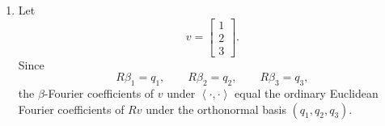\documentclass[12pt]{article}
\newcommand{\ip}[2]{\left\langle #1,#2\right\rangle}
\begin{document}
\begin{enumerate}[label=(\alph*)]
  Now pull this Euclidean orthonormal basis back to the original space. Since
  \[
    R^{-1}=
    \begin{bmatrix}
      1&0&-1\\
      0&\frac1{\sqrt2}&0\\
      0&0&1
    \end{bmatrix},
  \]
  we get
  \[
    R^{-1}q_1
    =
    \begin{bmatrix}
      1&0&-1\\
      0&\frac1{\sqrt2}&0\\
      0&0&1
    \end{bmatrix}
    \begin{bmatrix}1\\0\\0\end{bmatrix}
    =
    e_1,
  \]
  \[
    R^{-1}q_2
    =
    \begin{bmatrix}
      1&0&-1\\
      0&\frac1{\sqrt2}&0\\
      0&0&1
    \end{bmatrix}
    \begin{bmatrix}0\\1\\0\end{bmatrix}
    =
    \frac{e_2}{\sqrt2},
  \]
  and
  \[
    R^{-1}q_3
    =
    \begin{bmatrix}
      1&0&-1\\
      0&\frac1{\sqrt2}&0\\
      0&0&1
    \end{bmatrix}
    \begin{bmatrix}0\\0\\1\end{bmatrix}
    =
    -e_1+e_3.
  \]
  Hence
  \[
    \boxed{
    \beta=
    \left(
    e_1,
    \frac{e_2}{\sqrt2},
    e_3-e_1
    \right).}
  \]

  Finally, this basis is orthonormal with respect to $\ip{\cdot}{\cdot}$ because
  \[
    R\beta_i=q_i
    \qquad (i=1,2,3),
  \]
  and hence
  \[
    \ip{\beta_i}{\beta_j}
    =
    (R\beta_i)\cdot(R\beta_j)
    =
    q_i\cdot q_j
    =
    \delta_{ij}.
  \]

  \item Let
  \[
    v=\begin{bmatrix}1\\2\\3\end{bmatrix}.
  \]
  Since
  \[
    R\beta_1=q_1,\qquad R\beta_2=q_2,\qquad R\beta_3=q_3,
  \]
  the $\beta$-Fourier coefficients of $v$ under $\ip{\cdot}{\cdot}$ equal the
  ordinary Euclidean Fourier coefficients of $Rv$ under the orthonormal basis
  $(q_1,q_2,q_3)$.


\end{enumerate}
\end{document}
